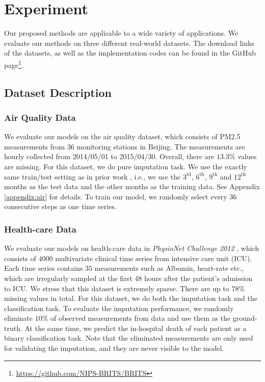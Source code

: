 \documentclass{article}
\begin{document}
 \section{Experiment}
\label{sec:exp}
Our proposed methods are applicable to a wide variety of applications. We evaluate our methods on three different real-world datasets. The download links of the datasets, as well as the implementation codes can be found in the GitHub page\footnote{\url{https://github.com/NIPS-BRITS/BRITS}}.

\subsection{Dataset Description}





\subsubsection{Air Quality Data}
We evaluate our models on the air quality dataset, which consists of PM2.5 measurements from $36$ monitoring stations in Beijing. The measurements are hourly collected  from 2014/05/01 to 2015/04/30. Overall, there are $13.3\%$ values are missing. For this dataset, we do pure imputation task. We use the exactly same train/test  setting as in prior work \cite{yi2016st}, i.e., we use the $3^{\mathrm{rd}}$, $6^{\mathrm{th}}$, $9^{\mathrm{th}}$ and $12^{\mathrm{th}}$ months as the test data and the other months as the training data. See Appendix \ref{appendix:air} for details. To train our model, we randomly select every $36$ consecutive steps as one time series. 



\subsubsection{Health-care Data}
We evaluate our models on health-care data in {\em PhysioNet Challenge 2012} \cite{silva2012predicting}, which consists of $4000$ multivariate clinical time series from intensive care unit (ICU). Each time series contains $35$ measurements such as Albumin, heart-rate etc., which are irregularly sampled at the first $48$ hours after the patient's admission to ICU. We stress that this dataset is extremely sparse. There are up to $78\%$ missing values in total.
For this dataset, we do both the imputation task and  the classification task. To evaluate the imputation performance, we randomly eliminate $10\%$ of observed measurements from data and use them as the  ground-truth. At the same time, we predict the in-hospital death of each patient as a binary classification task. Note that the eliminated measurements are only used for validating the imputation, and they are never visible to the model.
\end{document}
